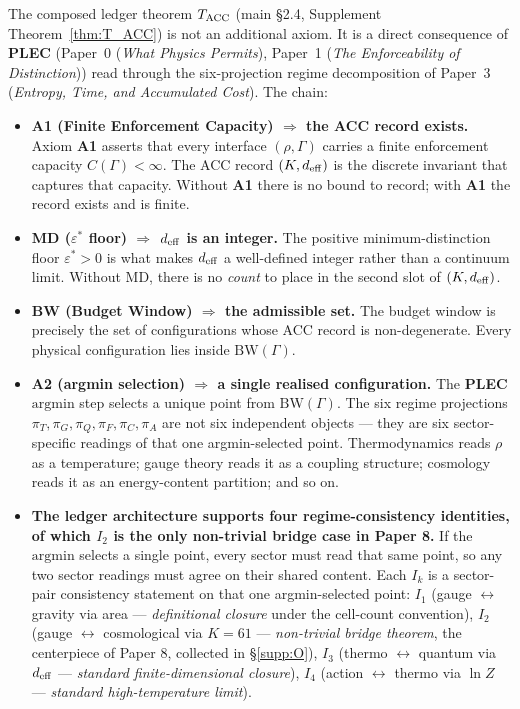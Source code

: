 \documentclass[11pt]{article}
\theoremstyle{plain}
\theoremstyle{definition}
\theoremstyle{remark}
\newcommand{\Aone}{\textbf{A1}}
\newcommand{\PLEC}{\textbf{PLEC}}
\newcommand{\paperref}[2]{Paper~#1 (\emph{#2})}
\begin{document}
The composed ledger theorem $T_{\rm ACC}$ (main \S2.4, Supplement Theorem~\ref{thm:T_ACC}) is not an additional axiom.  It is a direct consequence of \PLEC{} (\paperref{0}{What Physics Permits}, \paperref{1}{The Enforceability of Distinction}) read through the six-projection regime decomposition of \paperref{3}{Entropy, Time, and Accumulated Cost}.  The chain:

\begin{itemize}[leftmargin=2em,itemsep=6pt,topsep=4pt]
  \item \textbf{A1 (Finite Enforcement Capacity) $\Rightarrow$ the ACC record exists.}  Axiom \Aone{} asserts that every interface $(\rho, \Gamma)$ carries a finite enforcement capacity $C(\Gamma) < \infty$.  The ACC record $(K, d_{\rm eff})$ is the discrete invariant that captures that capacity.  Without \Aone{} there is no bound to record; with \Aone{} the record exists and is finite.

  \item \textbf{MD ($\varepsilon^*$ floor) $\Rightarrow$ $d_{\rm eff}$ is an integer.}  The positive minimum-distinction floor $\varepsilon^* > 0$ is what makes $d_{\rm eff}$ a well-defined integer rather than a continuum limit.  Without MD, there is no \emph{count} to place in the second slot of $(K, d_{\rm eff})$.

  \item \textbf{BW (Budget Window) $\Rightarrow$ the admissible set.}  The budget window is precisely the set of configurations whose ACC record is non-degenerate.  Every physical configuration lies inside $\mathrm{BW}(\Gamma)$.

  \item \textbf{A2 (argmin selection) $\Rightarrow$ a single realised configuration.}  The \PLEC{} $\mathrm{argmin}$ step selects a unique point from $\mathrm{BW}(\Gamma)$.  The six regime projections $\pi_T, \pi_G, \pi_Q, \pi_F, \pi_C, \pi_A$ are not six independent objects --- they are six sector-specific readings of that one argmin-selected point.  Thermodynamics reads $\rho$ as a temperature; gauge theory reads it as a coupling structure; cosmology reads it as an energy-content partition; and so on.

  \item \textbf{The ledger architecture supports four regime-consistency identities, of which $I_2$ is the only non-trivial bridge case in Paper 8.}  If the $\mathrm{argmin}$ selects a single point, every sector must read that same point, so any two sector readings must agree on their shared content.  Each $I_k$ is a sector-pair consistency statement on that one argmin-selected point: $I_1$ (gauge $\leftrightarrow$ gravity via area --- \emph{definitional closure} under the cell-count convention), $I_2$ (gauge $\leftrightarrow$ cosmological via $K = 61$ --- \emph{non-trivial bridge theorem}, the centerpiece of Paper 8, collected in \S\ref{supp:O}), $I_3$ (thermo $\leftrightarrow$ quantum via $d_{\rm eff}$ --- \emph{standard finite-dimensional closure}), $I_4$ (action $\leftrightarrow$ thermo via $\ln Z$ --- \emph{standard high-temperature limit}).


\end{itemize}
\end{document}
